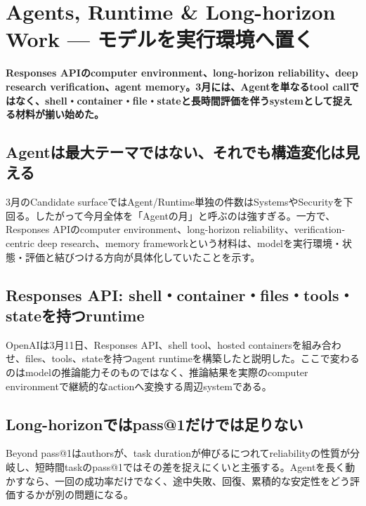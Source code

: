 \section{Agents, Runtime \& Long-horizon Work — モデルを実行環境へ置く}
\noindent\textbf{Responses APIのcomputer environment、long-horizon reliability、deep research verification、agent memory。3月には、Agentを単なるtool callではなく、shell・container・file・stateと長時間評価を伴うsystemとして捉える材料が揃い始めた。}\autocite{src-01572b4c34e9,src-0ec537ec1cc1,src-2b8b39e5cae3,src-42318ebdee75}

\subsection{Agentは最大テーマではない、それでも構造変化は見える}

3月のCandidate surfaceではAgent/Runtime単独の件数はSystemsやSecurityを下回る。したがって今月全体を「Agentの月」と呼ぶのは強すぎる。一方で、Responses APIのcomputer environment、long-horizon reliability、verification-centric deep research、memory frameworkという材料は、modelを実行環境・状態・評価と結びつける方向が具体化していたことを示す。\autocite{src-01572b4c34e9,src-0ec537ec1cc1,src-2b8b39e5cae3,src-42318ebdee75}


\subsection{Responses API: shell・container・files・tools・stateを持つruntime}

OpenAIは3月11日、Responses API、shell tool、hosted containersを組み合わせ、files、tools、stateを持つagent runtimeを構築したと説明した。ここで変わるのはmodelの推論能力そのものではなく、推論結果を実際のcomputer environmentで継続的なactionへ変換する周辺systemである。\autocite{src-01572b4c34e9}


\subsection{Long-horizonではpass@1だけでは足りない}

Beyond pass@1はauthorsが、task durationが伸びるにつれてreliabilityの性質が分岐し、短時間taskのpass@1ではその差を捉えにくいと主張する。Agentを長く動かすなら、一回の成功率だけでなく、途中失敗、回復、累積的な安定性をどう評価するかが別の問題になる。\autocite{src-0ec537ec1cc1}


